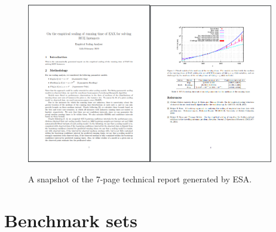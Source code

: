 \documentclass[aic]{iosart2x}
\begin{document}
\begin{figure}[t]
\begin{centering}
\includegraphics[width=0.48\textwidth]{ESA_Snapshot_1}\includegraphics[width=0.48\textwidth]{ESA_Snapshot_2}
\par\end{centering}

\caption{A snapshot of the 7-page technical report generated by ESA.}\label{fig:Snapshot-ESA-output}
\end{figure}


\section{Benchmark sets}
\label{sec:AA}
\end{document}

